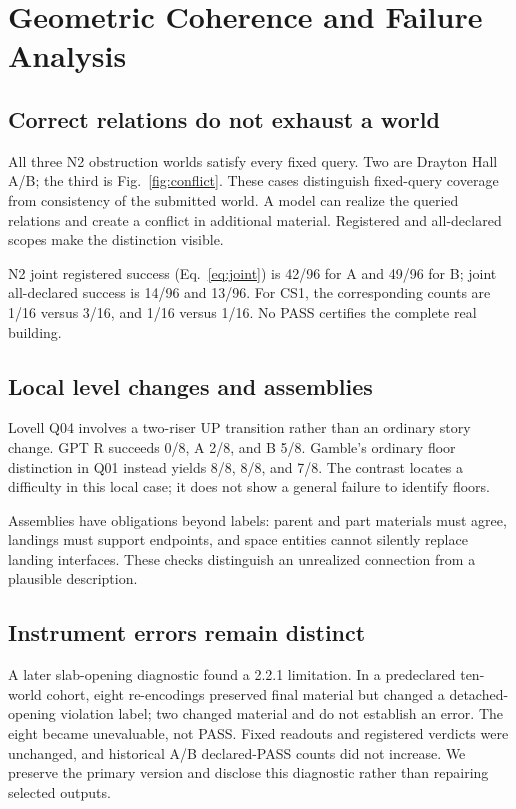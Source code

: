 \section{Geometric Coherence and Failure Analysis}
\label{sec:coherence}



\begin{center}
\small

\label{tab:geometry}
\end{center}

\subsection{Correct relations do not exhaust a world}
All three N2 obstruction worlds satisfy every fixed query.
Two are Drayton Hall A/B; the third is Fig.~\ref{fig:conflict}.
These cases distinguish fixed-query coverage from consistency of the
submitted world. A model can realize the queried relations and create
a conflict in additional material.
Registered and all-declared scopes make the distinction visible.

N2 joint registered success (Eq.~\ref{eq:joint}) is 42/96 for A and
49/96 for B; joint all-declared success is 14/96 and 13/96.
For CS1, the corresponding counts are 1/16 versus 3/16, and 1/16
versus 1/16. No PASS certifies the complete real building.

\subsection{Local level changes and assemblies}
Lovell Q04 involves a two-riser UP transition rather than an ordinary
story change. GPT R succeeds 0/8, A 2/8, and B 5/8.
Gamble's ordinary floor distinction in Q01 instead yields 8/8, 8/8, and 7/8.
The contrast locates a difficulty in this local case; it does not
show a general failure to identify floors.

Assemblies have obligations beyond labels: parent and part materials
must agree, landings must support endpoints, and space entities cannot
silently replace landing interfaces. These checks distinguish an
unrealized connection from a plausible description.

\subsection{Instrument errors remain distinct}
A later slab-opening diagnostic found a 2.2.1 limitation.
In a predeclared ten-world cohort, eight re-encodings preserved final
material but changed a detached-opening violation label; two changed
material and do not establish an error.
The eight became unevaluable, not PASS. Fixed readouts and registered
verdicts were unchanged, and historical A/B declared-PASS counts did
not increase. We preserve the primary version and disclose this
diagnostic rather than repairing selected outputs.
